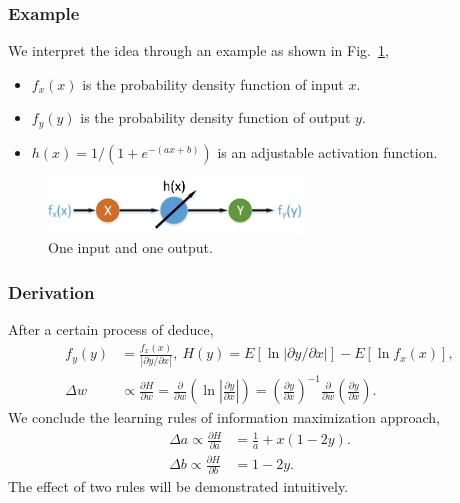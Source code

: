 \documentclass[10pt, mathserif]{beamer}	%
\newcommand{\ftitle}[1]{\frametitle{\hspace{4ex} {#1}}}	%
\begin{document}
\begin{CJK}{UTF8}{song}
\begin{frame}
	\ftitle{Example}
	We interpret the idea through an example as shown in Fig.~\ref{fig:network},
	\begin{itemize}
		\item $f_x(x)$ is the probability density function of input $x$.
		\item $f_y(y)$ is the probability density function of output $y$.
		\item $h(x)=1/(1+e^{-(ax+b)})$ is an adjustable activation function.
	\end{itemize}
	\begin{figure}[htbp]
		\includegraphics[width=0.6\textwidth]{network.pdf}
		\caption{One input and one output.} \label{fig:network}
	\end{figure}
\end{frame}

\begin{frame}
	\ftitle{Derivation}
	After a certain process of deduce,
	\begin{align}
		f_y(y) &= \frac{f_x(x)}{|\partial y/\partial x|},\ H(y)=E[\ln |\partial y/\partial x|] - E[\ln f_x(x)],\\
		\Delta w & \varpropto \frac{\partial H}{\partial w} = \frac{\partial }{\partial w} \left( \ln \left| \frac{\partial y}{\partial x} \right| \right) = \left( \frac{\partial y}{\partial x} \right)^{-1} \frac{\partial }{\partial w} \left( \frac{\partial y}{\partial x} \right).
	\end{align}
	We conclude the {\color{red}learning rules} of information maximization approach,
	\begin{align}
		\Delta a \varpropto \frac{\partial H}{\partial a} &= \frac{1}{a} + x(1-2y).\\
		\Delta b \varpropto \frac{\partial H}{\partial b} &= 1-2y.
	\end{align}
	The effect of two rules will be demonstrated intuitively.
\end{frame}


\end{CJK}
\end{document}
